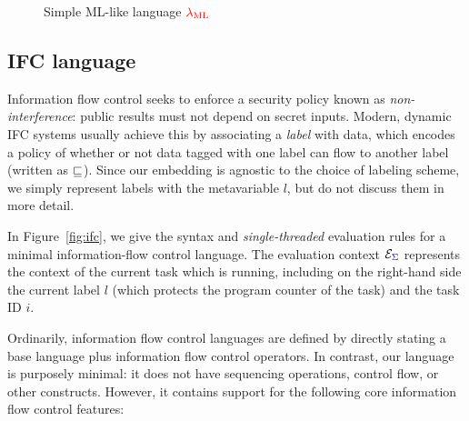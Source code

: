 \documentclass{sigplanconf}
\newcommand{\Red}[1]{{\color{red} #1}}
\begin{document}
\begin{figure}

\caption{Simple ML-like language \ensuremath{\Red{\lambda_{\text{ML}}}}}
\label{fig:ml}
\end{figure}

\subsection{IFC language}

Information flow control seeks to enforce a security policy known as
\emph{non-interference}: public results must not depend on secret inputs.
Modern, dynamic IFC systems usually achieve this by associating a \emph{label}
with data, which encodes a policy of whether or not data tagged with one
label can flow to another label (written as \ensuremath{\flows}).
Since our embedding is agnostic
to the choice of labeling scheme, we simply represent labels with the metavariable
$l$, but do not discuss them in more detail.

In Figure~\ref{fig:ifc}, we give the syntax and \emph{single-threaded}
evaluation rules for a minimal information-flow control language.  The
evaluation context $\mathcal{E}_{{\color{blue} \Sigma}}$ represents the context
of the current task which is running, including on the right-hand side
the current label $l$ (which protects the program counter of the task)
and the task ID $i$.

Ordinarily, information flow control languages are defined by directly
stating a base language plus information flow control operators.  In
contrast, our language is purposely minimal: it does not have sequencing
operations, control flow, or other constructs.  However, it contains
support for the following core information flow control features:
\end{document}
